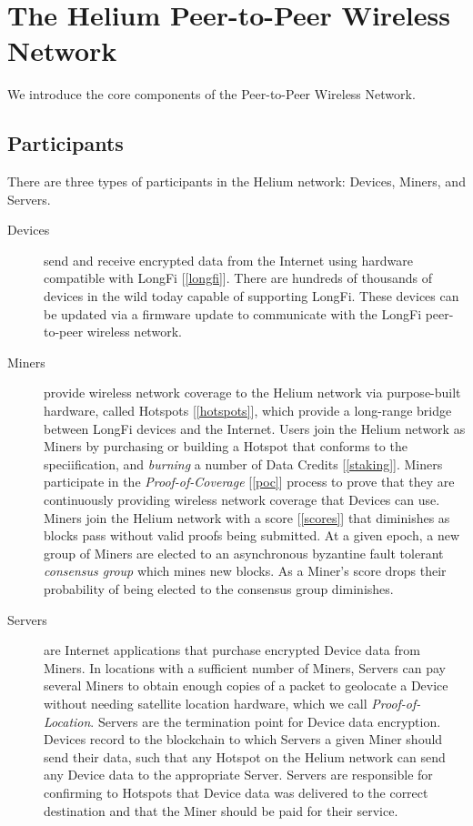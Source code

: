 \documentclass[10pt, nonatbib, nocopyrightspace, reprint]{sigplanconf}
\newcommand{\secref}[1]{[\autoref{#1}]}
\begin{document}
\section{The Helium Peer-to-Peer Wireless Network}

We introduce the core components of the Peer-to-Peer Wireless Network.

\subsection{Participants}

There are three types of participants in the Helium network: Devices, Miners, and Servers.

\begin{description}
    \item [Devices] send and receive encrypted data from the Internet using hardware compatible with LongFi \secref{longfi}. There are hundreds of thousands of devices in the wild today capable of supporting LongFi. These devices can be updated via a firmware update to communicate with the LongFi peer-to-peer wireless network.
    \item [Miners] provide wireless network coverage to the Helium network via purpose-built hardware, called Hotspots \secref{hotspots}, which provide a long-range bridge between LongFi devices and the Internet. Users join the Helium network as Miners by purchasing or building a Hotspot that conforms to the speciification, and \emph{burning} a number of Data Credits \secref{staking}. Miners participate in the \emph{Proof-of-Coverage} \secref{poc} process to prove that they are continuously providing wireless network coverage that Devices can use. Miners join the Helium network with a score \secref{scores} that diminishes as blocks pass without valid proofs being submitted. At a given epoch, a new group of Miners are elected to an asynchronous byzantine fault tolerant \emph{consensus group} which mines new blocks. As a Miner's score drops their probability of being elected to the consensus group diminishes.
    \item [Servers] are Internet applications that purchase encrypted Device data from Miners. In locations with a sufficient number of Miners, Servers can pay several Miners to obtain enough copies of a packet to geolocate a Device without needing satellite location hardware, which we call \emph{Proof-of-Location}. Servers are the termination point for Device data encryption. Devices record to the blockchain to which Servers a given Miner should send their data, such that any Hotspot on the Helium network can send any Device data to the appropriate Server. Servers are responsible for confirming to Hotspots that Device data was delivered to the correct destination and that the Miner should be paid for their service.
\end{description}
\end{document}
